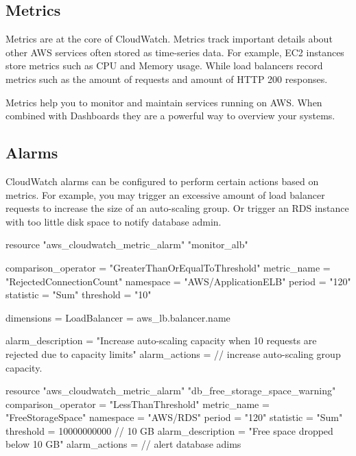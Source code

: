 \documentclass{csse4400}
\begin{document}
\subsection{Metrics}
Metrics are at the core of CloudWatch.
Metrics track important details about other AWS services often stored as time-series data.
For example, EC2 instances store metrics such as CPU and Memory usage.
While load balancers record metrics such as the amount of requests and amount of HTTP 200 responses.

Metrics help you to monitor and maintain services running on AWS.
When combined with Dashboards they are a powerful way to overview your systems.

\subsection{Alarms}
CloudWatch alarms can be configured to perform certain actions based on metrics.
For example, you may trigger an excessive amount of load balancer requests to increase the size of an auto-scaling group.
Or trigger an RDS instance with too little disk space to notify database admin.

\begin{code}[language=terraform]{}
resource "aws_cloudwatch_metric_alarm" "monitor_alb" {
  comparison_operator = "GreaterThanOrEqualToThreshold"
  metric_name         = "RejectedConnectionCount"
  namespace           = "AWS/ApplicationELB"
  period              = "120"
  statistic           = "Sum"
  threshold           = "10"

  dimensions = {
    LoadBalancer = aws_lb.balancer.name
  }

  alarm_description = "Increase auto-scaling capacity when 10 requests are rejected due to capacity limits"
  alarm_actions     = // increase auto-scaling group capacity.
}

resource "aws_cloudwatch_metric_alarm" "db_free_storage_space_warning" {
  comparison_operator = "LessThanThreshold"
  metric_name         = "FreeStorageSpace"
  namespace           = "AWS/RDS"
  period              = "120"
  statistic           = "Sum"
  threshold           = 10000000000 // 10 GB
  alarm_description   = "Free space dropped below 10 GB"
  alarm_actions       = // alert database adims
}
\end{code}

\end{document}
